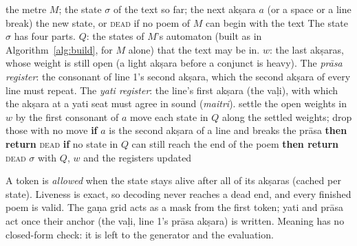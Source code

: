 \documentclass[11pt]{article}
\begin{document}
\begin{algorithm}[H]
\caption{The enforcer}\label{alg:step}
\scriptsize
\begin{algorithmic}[1]
\Require the metre $M$; the state $\sigma$ of the text so far; the next akṣara $a$ (or a space or a line
break)
\Ensure the new state, or \textsc{dead} if no poem of $M$ can begin with the text
\Symbols The state $\sigma$ has four parts. $Q$: the states of $M$'s automaton (built as in
Algorithm~\ref{alg:build}, for $M$ alone) that the text may be in. $w$: the last akṣaras, whose weight is
still open (a light akṣara before a conjunct is heavy). The \emph{prāsa register}: the consonant of line
1's second akṣara, which the second akṣara of every line must repeat. The \emph{yati register}: the line's
first akṣara (the vaḷi), with which the akṣara at a yati seat must agree in sound (\emph{maitri}).
\State settle the open weights in $w$ by the first consonant of $a$
\State move each state in $Q$ along the settled weights; drop those with no move
\State \textbf{if} $a$ is the second akṣara of a line and breaks the prāsa \textbf{then return} \textsc{dead}
\State \textbf{if} no state in $Q$ can still reach the end of the poem \textbf{then return} \textsc{dead}
\State \Return $\sigma$ with $Q$, $w$ and the registers updated
\end{algorithmic}
A token is \emph{allowed} when the state stays alive after all of its akṣaras (cached per state). Liveness
is exact, so decoding never reaches a dead end, and every finished poem is valid. The gaṇa grid acts as a
mask from the first token; yati and prāsa act once their anchor (the vaḷi, line 1's prāsa akṣara) is
written. Meaning has no closed-form check: it is left to the generator and the evaluation.
\end{algorithm}
\end{document}
